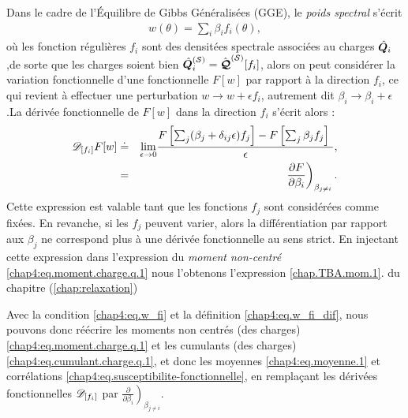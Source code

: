 Dans le cadre de l'Équilibre de Gibbs Généralisées (GGE), le {\em poids spectral} s'écrit 
\begin{eqnarray}\label{chap4:eq.w_fi}
	w(\theta) = \sum_i \beta_i f_i(\theta),	
\end{eqnarray}
où les fonction régulières $f_i$ sont des densitées spectrale associées au charges $\hat{\bm{Q}}_i$,de sorte que les charges soient bien $\hat{\bm{Q}}_i^{(\mathcal{S})} = \hat{\bm{\mathcal{Q}}}^{(\mathcal{S})}[f_i] $, alors on peut considérer la variation fonctionnelle d'une fonctionnelle $F[w]$ par rapport à la direction $f_i$, ce qui revient à effectuer une perturbation $w \rightarrow w + \epsilon f_i$, autrement dit $\beta_i \rightarrow \beta_i + \epsilon$.La dérivée fonctionnelle de $F[w]$ dans la direction $f_i$ s’écrit alors :
\begin{eqnarray}\label{chap4:eq.w_fi_dif}
	\dfonc{f_i} F[w]  &\doteq &  \underset{\epsilon \to 0 }{ \lim  } \frac{ F\left[\sum_j ( \beta_j + \delta_{ij} \epsilon) f_j \right]  - F \left[\sum_j  \beta_j f_j\right] }{\epsilon},\\
	& = & \left. \frac{ \partial F}{ \partial \beta_i } \right)_{\beta_{j\neq i} }.	
\end{eqnarray}
Cette expression est valable tant que les fonctions $f_j$ sont considérées comme fixées. En revanche, si les $f_j$ peuvent varier, alors la différentiation par rapport aux $\beta_j$ ne correspond plus à une dérivée fonctionnelle au sens strict.
En injectant cette expression dans l'expression du {\em moment non-centré} \eqref{chap4:eq.moment.charge.q.1} nous l'obtenons l'expression \eqref{chap.TBA.mom.1}. du chapitre (\ref{chap:relaxation}) 

Avec la condition \eqref{chap4:eq.w_fi} et la définition \eqref{chap4:eq.w_fi_dif}, nous pouvons donc réécrire les moments non centrés (des charges) \eqref{chap4:eq.moment.charge.q.1} et les cumulants (des charges) \eqref{chap4:eq.cumulant.charge.q.1}, et donc les moyennes \eqref{chap4:eq.moyenne.1} et corrélations \eqref{chap4:eq.susceptibilite-fonctionnelle}, en remplaçant les dérivées fonctionnelles $\mathscr{D}_{[f_i]}$ par $\left. \frac{ \partial}{ \partial \beta_i } \right)_{\beta_{j\neq i}}$.

